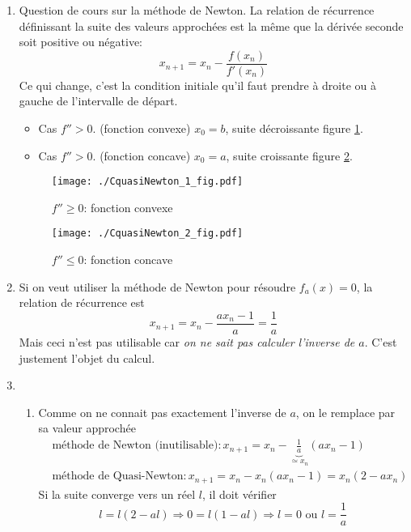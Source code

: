 \begin{enumerate}
  \item Question de cours sur la méthode de Newton.\newline
  La relation de récurrence définissant la suite des valeurs approchées est la même que la dérivée seconde soit positive ou négative:
\begin{displaymath}
  x_{n+1} = x_n - \frac{f(x_n)}{f'(x_n)}
\end{displaymath}
Ce qui change, c'est la condition initiale qu'il faut prendre à droite ou à gauche de l'intervalle de départ.
\begin{itemize}
  \item Cas $f''>0$. (fonction convexe) $x_0 = b$, suite décroissante figure \ref{fig: CquasiNewton_1}.
  \item Cas $f''>0$. (fonction concave) $x_0 = a$, suite croissante figure \ref{fig: CquasiNewton_2}.
\end{itemize}

\begin{figure}[h]
  \centering
  \texttt{[image: ./CquasiNewton\_1\_fig.pdf]}
  \caption{$f''\geq 0$: fonction convexe}
  \label{fig: CquasiNewton_1}
\end{figure}
\begin{figure}[h]
  \centering
  \texttt{[image: ./CquasiNewton\_2\_fig.pdf]}
  \caption{$f''\leq 0$: fonction concave}
  \label{fig: CquasiNewton_2}
\end{figure}

  \item Si on veut utiliser la méthode de Newton pour résoudre $f_a(x) = 0$, la relation de récurrence est 
\begin{displaymath}
  x_{n+1} = x_n - \frac{ax_n -1}{ a} = \frac{1}{a}
\end{displaymath}
Mais ceci n'est pas utilisable car \emph{on ne sait pas calculer l'inverse de $a$}. C'est justement l'objet du calcul. 

  \item
\begin{enumerate}
  \item Comme on ne connait pas exactement l'inverse de $a$, on le remplace par sa valeur approchée 
\begin{align*}
  &\text{méthode de Newton (inutilisable)}: x_{n+1} = x_n - \underset{\simeq x_n}{\underbrace{\frac{1}{ a}}}(ax_n -1) \\
  &\text{méthode de Quasi-Newton}: x_{n+1} = x_n-x_n(ax_n - 1) = x_n(2-ax_n)
\end{align*}
Si la suite converge vers un réel $l$, il doit vérifier
\begin{displaymath}
  l=l(2-al) \Rightarrow 0 = l(1-al) \Rightarrow l =0 \text{ ou } l=\frac{1}{a}
\end{displaymath}


\end{enumerate}
\end{enumerate}
